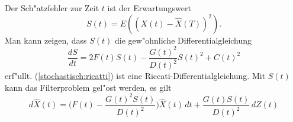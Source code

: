 Der Sch"atzfehler zur Zeit $t$ ist der Erwartungswert
\[
S(t) = E((X(t)-\hat X(T))^2).
\]
Man kann zeigen, dass $S(t)$ die gew"ohnliche Differentialgleichung
\begin{equation}
\frac{dS}{dt}
=
2F(t)S(t) - \frac{G(t)^2}{D(t)^2}S(t)^2 +C(t)^2
\label{stochastisch:ricatti}
\end{equation}
erf"ullt.
(\ref{stochastisch:ricatti}) ist eine Riccati-Differentialgleichung.
Mit $S(t)$ kann das Filterproblem gel"ost werden, es gilt
\begin{equation}
d\hat X(t)
=
\biggl(F(t)-\frac{G(t)^2S(t)}{D(t)^2}\biggr)\hat X(t)\,dt 
+
\frac{G(t)S(t)}{D(t)^2}\,dZ(t)
\end{equation}







